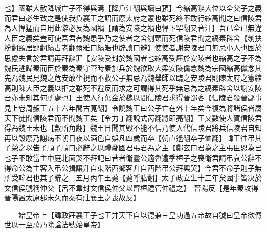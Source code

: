 也】國雖大赦降城亡子不得與焉【降戶江翻與讀曰預】今縮高辭大位以全父子之義而君曰必生致之是使我負襄王之詔而廢太府之憲也雖死終不敢行縮高聞之曰信陵君為人悍猛而自用此辭必反為國禍【謂為安陵之禍也悍下罕翻又音汗】吾已全已無違人臣之義矣豈可使吾君有魏患乎乃之使者之舍刎頸而死信陵君聞之縞素辟舍【刎扶粉翻頸居郢翻縞古老翻爾雅曰縞皓也辟讀曰避】使使者謝安陵君曰無忌小人也困於思慮失言於君請再拜辭罪【安陵受封於魏國者也縮高受㕓於安陵者也縮高之子不為魏民逃歸秦而臣於秦為秦守管時秦加兵於魏欲取大梁安陵儻念魏為宗國縮高儻念其先為魏民見魏之危安敢坐視而不救公子無忌為魏舉師以臨之安陵君則陳太府之憲縮高則陳大臣之義以拒之雖死不避反而求之可謂得其死乎無忌為之縞素辟舍以謝安陵吾亦未知其何所處也】王使人行萬金於魏以間信陵君求得晉鄙客【信陵君殺晉鄙事見上卷周赧王五十六年間古莧翻】令說魏王曰公子亡在外十年矣今復為將諸侯皆屬天下徒聞信陵君而不聞魏王矣【令力丁翻說式芮翻將即亮翻】王又數使人賀信陵君得為魏王未也【數所角翻】魏王日聞其毁不能不信乃使人代信陵君將兵信陵君自知再以毁廢乃謝病不朝日夜以酒色自娛凡四歲而卒【朝直遙翻卒子恤翻】韓王往弔其子榮之以告子順子順曰必辭之以禮鄰國君弔君為之主【鄭玄曰君為之主弔臣恩為已也子不敢當主中庭北面哭不拜記曰昔者衛靈公適魯遭季桓子之喪衛君請弔哀公辭不得命公為主客入弔公揖讓升自東階西鄉客升自西階弔公拜興哭】今君不命子則子無所受韓君也其子辭之　五月丙午王薨【薨呼肱翻】太子政立生十三年矣國事皆决於文信侯號稱仲父【呂不韋封文信侯仲父以齊桓禮管仲禮之】　晉陽反【是年秦攻得晉陽置太原郡未久而秦有莊襄王之喪故反】

　　始皇帝上【諱政莊襄王子也王并天下自以德兼三皇功過五帝故自號曰皇帝欲傳世以一至萬乃除諡法號始皇帝】

